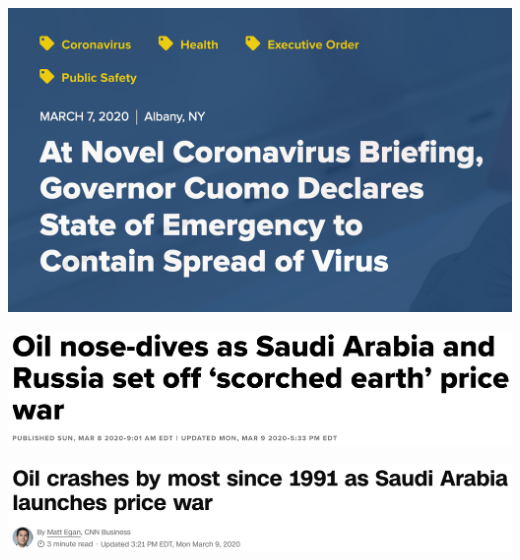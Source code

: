 \documentclass[9pt]{beamer}
\theoremstyle{definition}
\begin{document}
\begin{frame}

    \begin{example}
        \href{https://www.governor.ny.gov/news/novel-coronavirus-briefing-governor-cuomo-declares-state-emergency-contain-spread-virus}{\includegraphics[scale=.3]{NYS_state.png}}

        \href{https://www.cnbc.com/2020/03/08/opec-deal-collapse-sparks-price-war-20-oil-in-2020-is-coming.html}{\includegraphics[scale=.3]{cnn.png}}

        \href{https://www.cnn.com/2020/03/08/investing/oil-prices-crash-opec-russia-saudi-arabia/index.html}{\includegraphics[scale=.3]{cnbc.png}}
        \end{example}

\end{frame}
\end{document}
